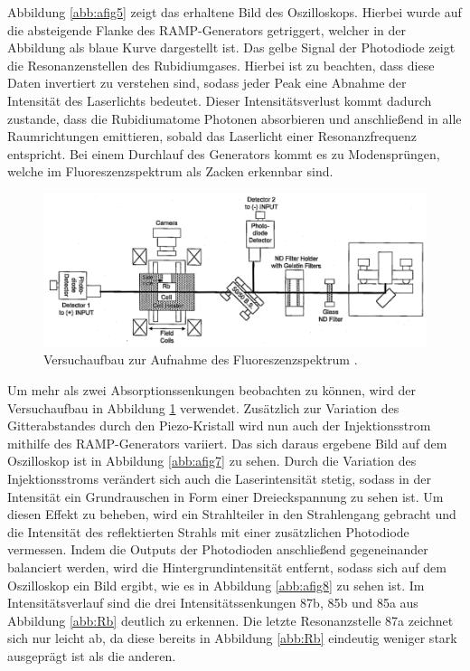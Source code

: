 Abbildung \ref{abb:afig5} zeigt das erhaltene Bild des Oszilloskops.
Hierbei wurde auf die absteigende Flanke des RAMP-Generators getriggert, welcher in der Abbildung als blaue Kurve dargestellt ist.
Das gelbe Signal der Photodiode zeigt die Resonanzenstellen des Rubidiumgases.
Hierbei ist zu beachten, dass diese Daten invertiert zu verstehen sind, sodass jeder Peak eine Abnahme der Intensität des Laserlichts bedeutet.
Dieser Intensitätsverlust kommt dadurch zustande, dass die Rubidiumatome Photonen absorbieren und anschließend in alle Raumrichtungen emittieren, sobald das Laserlicht einer Resonanzfrequenz entspricht.
Bei einem Durchlauf des Generators kommt es zu Modensprüngen, welche im Fluoreszenzspektrum als Zacken erkennbar sind.

\begin{figure}
    \centering
    \includegraphics[width=\textwidth]{pics/aufbau3}
    \caption{Versuchaufbau zur Aufnahme des Fluoreszenzspektrum \cite{anleitung}.}
    \label{abb:afig6}
\end{figure}

Um mehr als zwei Absorptionssenkungen beobachten zu können, wird der Versuchaufbau in Abbildung \ref{abb:afig6} verwendet.
Zusätzlich zur Variation des Gitterabstandes durch den Piezo-Kristall wird nun auch der Injektionsstrom mithilfe des RAMP-Generators variiert.
Das sich daraus ergebene Bild auf dem Oszilloskop ist in Abbildung \ref{abb:afig7} zu sehen.
Durch die Variation des Injektionsstroms verändert sich auch die Laserintensität stetig, sodass in der Intensität ein Grundrauschen in Form einer Dreieckspannung zu sehen ist.
Um diesen Effekt zu beheben, wird ein Strahlteiler in den Strahlengang gebracht und die Intensität des reflektierten Strahls mit einer zusätzlichen Photodiode vermessen.
Indem die Outputs der Photodioden anschließend gegeneinander balanciert werden, wird die Hintergrundintensität entfernt, sodass sich auf dem Oszilloskop ein Bild ergibt, wie es in Abbildung \ref{abb:afig8} zu sehen ist.
Im Intensitätsverlauf sind die drei Intensitätssenkungen 87b, 85b und 85a aus Abbildung \ref{abb:Rb} deutlich zu erkennen.
Die letzte Resonanzstelle 87a zeichnet sich nur leicht ab, da diese bereits in Abbildung \ref{abb:Rb} eindeutig weniger stark ausgeprägt ist als die anderen.

